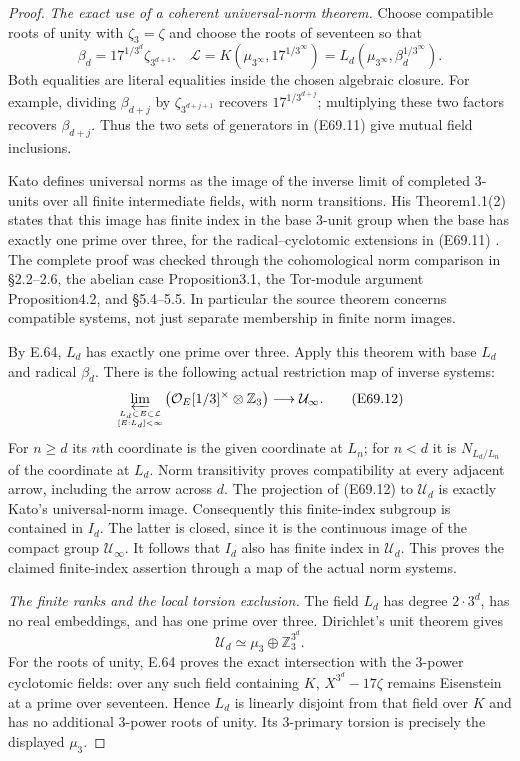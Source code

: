 \begin{proof}
\emph{The exact use of a coherent universal-norm theorem.}
Choose compatible roots of unity with $\zeta_3=\zeta$ and choose
the roots of seventeen so that
\[
 \beta_d=17^{1/3^d}\zeta_{3^{d+1}}.
 \quad
 \mathcal L=K(\mu_{3^\infty},17^{1/3^\infty})
       =L_d(\mu_{3^\infty},\beta_d^{1/3^\infty}).
 \tag{E69.11}
\]
Both equalities are literal equalities inside the chosen algebraic
closure. For example, dividing
$\beta_{d+j}$ by $\zeta_{3^{d+j+1}}$ recovers
$17^{1/3^{d+j}}$; multiplying these two factors recovers
$\beta_{d+j}$. Thus the two sets of generators in (E69.11) give
mutual field inclusions.

Kato defines universal norms as the image of the inverse limit of
completed $3$-units over all finite intermediate fields, with norm
transitions. His Theorem1.1(2) states that this image has finite
index in the base $3$-unit group when the base has exactly one prime
over three, for the radical--cyclotomic extensions in (E69.11)
\cite[pp.551--552, definition and Theorem1.1; Corollary5.2(2)]
{E_KatoUniversalNorms}.
The complete proof was checked through the cohomological norm
comparison in \S2.2--2.6, the abelian case Proposition3.1, the
Tor-module argument Proposition4.2, and \S5.4--5.5.
In particular the source theorem concerns compatible systems,
not just separate membership in finite norm images.

By E.64, $L_d$ has exactly one prime over three. Apply this theorem
with base $L_d$ and radical $\beta_d$.
There is the following actual restriction map of inverse systems:
\[
 \varprojlim_{L_d\subset E\subset\mathcal L\atop [E:L_d]<\infty}
       \bigl(\mathcal O_E[1/3]^\times\otimes\mathbb Z_3\bigr)
       \longrightarrow \mathcal U_\infty.
 \tag{E69.12}
\]
For $n\ge d$ its $n$th coordinate is the given coordinate at $L_n$;
for $n<d$ it is $N_{L_d/L_n}$ of the coordinate at $L_d$.
Norm transitivity proves compatibility at every adjacent arrow,
including the arrow across $d$. The projection of (E69.12) to
$\mathcal U_d$ is exactly Kato's universal-norm image.
Consequently this finite-index subgroup is contained in $I_d$.
The latter is closed, since it is the continuous image of the compact
group $\mathcal U_\infty$.
It follows that $I_d$ also has finite index in $\mathcal U_d$.
This proves the claimed finite-index assertion through a map of
the actual norm systems.

\emph{The finite ranks and the local torsion exclusion.}
The field $L_d$ has degree $2\cdot3^d$, has no real embeddings, and
has one prime over three. Dirichlet's unit theorem gives
\[
 \mathcal U_d\simeq\mu_3\oplus\mathbb Z_3^{3^d}.
 \tag{E69.13}
\]
For the roots of unity, E.64 proves the exact intersection with the
$3$-power cyclotomic fields: over any such field containing $K$,
$X^{3^d}-17\zeta$ remains Eisenstein at a prime over seventeen.
Hence $L_d$ is linearly disjoint from that field over $K$ and has
no additional $3$-power roots of unity. Its $3$-primary torsion is
precisely the displayed $\mu_3$.


\end{proof}
